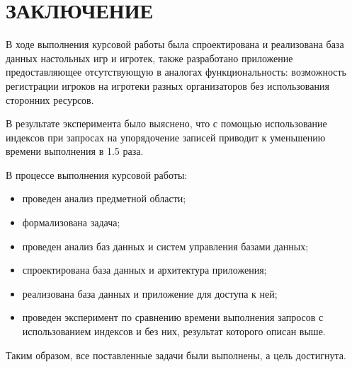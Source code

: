 \chapter*{ЗАКЛЮЧЕНИЕ}

В ходе выполнения курсовой работы была спроектирована и реализована база данных
настольных игр и игротек, также разработано приложение предоставляющее
отсутствующую в аналогах функциональность: возможность регистрации игроков на
игротеки разных организаторов без использования сторонних ресурсов.

В результате эксперимента было выяснено, что с помощью использование индексов
при запросах на упорядочение записей приводит к уменьшению времени выполнения
в 1.5 раза.

В процессе выполнения курсовой работы:
\begin{itemize}
    \item проведен анализ предметной области;
    \item формализована задача;
    \item проведен анализ баз данных и систем управления базами данных;
    \item спроектирована база данных и архитектура приложения;
    \item реализована база данных и приложение для доступа к ней;
    \item проведен эксперимент по сравнению времени выполнения запросов с
        использованием индексов и без них, результат которого описан выше.
\end{itemize}

Таким образом, все поставленные задачи были выполнены, а цель достигнута.
